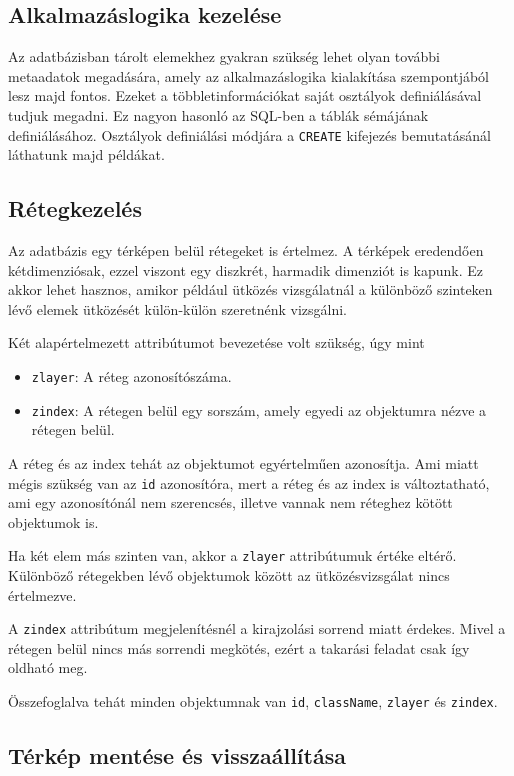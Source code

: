 \subsection{Alkalmazáslogika kezelése}

Az adatbázisban tárolt elemekhez gyakran szükség lehet olyan további metaadatok megadására, amely az alkalmazáslogika kialakítása szempontjából lesz majd fontos. Ezeket a többletinformációkat saját osztályok definiálásával tudjuk megadni. Ez nagyon hasonló az SQL-ben a táblák sémájának definiálásához. Osztályok definiálási módjára a \texttt{CREATE} kifejezés bemutatásánál láthatunk majd példákat.

\subsection{Rétegkezelés}

Az adatbázis egy térképen belül rétegeket is értelmez. A térképek eredendően kétdimenziósak, ezzel viszont egy diszkrét, harmadik dimenziót is kapunk. Ez akkor lehet hasznos, amikor például ütközés vizsgálatnál a különböző szinteken lévő elemek ütközését külön-külön szeretnénk vizsgálni.

Két alapértelmezett attribútumot bevezetése volt szükség, úgy mint
\begin{itemize}
\item \texttt{zlayer}: A réteg azonosítószáma.
\item \texttt{zindex}: A rétegen belül egy sorszám, amely egyedi az objektumra nézve a rétegen belül.
\end{itemize}

A réteg és az index tehát az objektumot egyértelműen azonosítja. Ami miatt mégis szükség van az \texttt{id} azonosítóra, mert a réteg és az index is változtatható, ami egy azonosítónál nem szerencsés, illetve vannak nem réteghez kötött objektumok is.

Ha két elem más szinten van, akkor a \texttt{zlayer} attribútumuk értéke eltérő. Különböző rétegekben lévő objektumok között az ütközésvizsgálat nincs értelmezve.

A \texttt{zindex} attribútum megjelenítésnél a kirajzolási sorrend miatt érdekes. Mivel a rétegen belül nincs más sorrendi megkötés, ezért a takarási feladat csak így oldható meg.

Összefoglalva tehát minden objektumnak van \texttt{id}, \texttt{className}, \texttt{zlayer} és \texttt{zindex}.

\subsection{Térkép mentése és visszaállítása}

